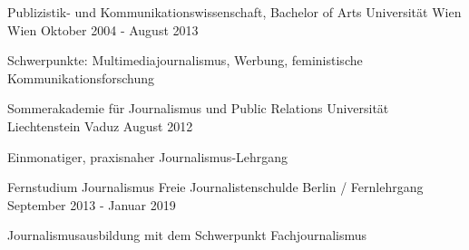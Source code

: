 

\begin{cventries}

  \cventry
    {Publizistik- und Kommunikationswissenschaft, Bachelor of Arts} %
    {Universität Wien} %
    {Wien} %
    {Oktober 2004 - August 2013} %
    {
      \begin{cvitems} %
        \item {Schwerpunkte: Multimediajournalismus, Werbung, feministische Kommunikationsforschung}
      \end{cvitems}
    }

    \cventry
    {Sommerakademie für Journalismus und Public Relations} %
    {Universität Liechtenstein} %
    {Vaduz} %
    {August 2012} %
    {
      \begin{cvitems} %
        \item {Einmonatiger, praxisnaher Journalismus-Lehrgang}
      \end{cvitems}
    }

    \cventry
    {Fernstudium Journalismus} %
    {Freie Journalistenschulde} %
    {Berlin / Fernlehrgang} %
    {September 2013 - Januar 2019} %
    {
      \begin{cvitems} %
        \item {Journalismusausbildung mit dem Schwerpunkt Fachjournalismus}
      \end{cvitems}
    }

  


\end{cventries}
